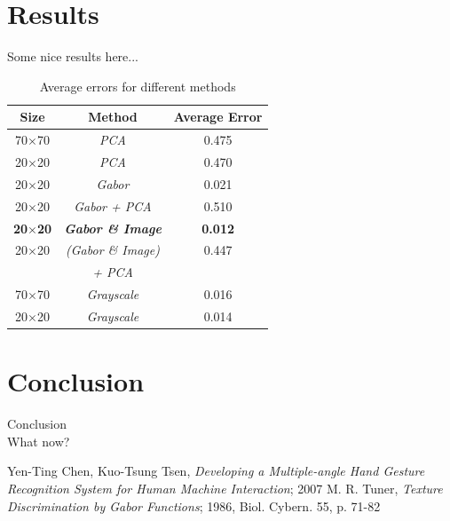 \documentclass[a4paper, 11pt, twocolumn]{article}
\begin{document}
    \section{Results}
	\label{sec:results}
    	Some nice results here...\\
		\begin{table}[!hbtp]
		\begin{tabular}{| c | c | c |}
			\hline\hline
			\textbf{Size} & \textbf{Method} & \textbf{Average Error}\\[7px] 
			\hline\hline
			  70$\times$70 & \emph{PCA} & 0.475\\
			\hline
			  20$\times$20 & \emph{PCA} & 0.470\\
			\hline
			  20$\times$20 & \emph{Gabor} & 0.021\\
			\hline
			  20$\times$20 & \emph{Gabor + PCA} & 0.510\\
			\hline
			  \textbf{20$\times$20} & \textbf{\emph{Gabor \& Image}} & \textbf{0.012}\\
		 	\hline
			  20$\times$20 & \emph{(Gabor \& Image)} & 0.447\\
		               & \emph {+ PCA}  &     \\ 			
			\hline
			  70$\times$70 & \emph{Grayscale} & 0.016\\
			\hline
			  20$\times$20 & \emph{Grayscale} & 0.014\\
			\hline
		\end{tabular}
		\caption{Average errors for different methods}
		\end{table}

    \section{Conclusion}
	\label{sec:conclusion}
    	Conclusion\\
   	 	What now?
	\begin{thebibliography}{2}
		Yen-Ting Chen, Kuo-Tsung Tsen, \emph{Developing a Multiple-angle Hand Gesture Recognition System for Human Machine Interaction}; 2007
		M. R. Tuner, \emph{Texture Discrimination by Gabor Functions}; 1986, Biol. Cybern. 55, p. 71-82 
	\end{thebibliography}    
\end{document}
